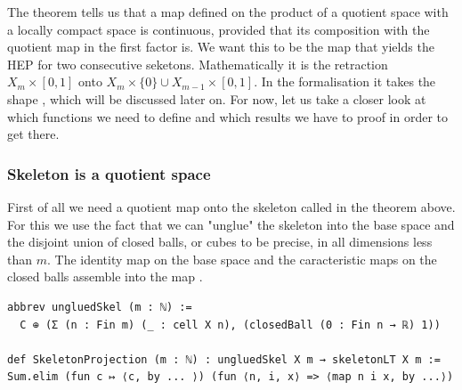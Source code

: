 \documentclass[11pt, a4paper, english]{article}
\theoremstyle{plain}
\theoremstyle{definition}
\theoremstyle{remark}
\numberwithin{equation}{section}
\numberwithin{theorem}{section}
\begin{document}
The theorem tells us that a map  defined on the product of a quotient space with a locally compact space is continuous, provided that its composition with the quotient map in the first factor is. We want this  to be the map that yields the HEP for two consecutive seketons. Mathematically it is the retraction $X_m \times [0,1]$ onto $X_m \times \{0\} \cup X_{m-1} \times [0,1]$. In the formalisation it takes the shape , which will be discussed later on. For now, let us take a closer look at which functions we need to define and which results we have to proof in order to get there. \\

\subsubsection{Skeleton is a quotient space}  \label{subsubsec:lean:skel:quotient}
First of all we need a quotient map onto the skeleton  called  in the theorem above. For this we use the fact that we can "unglue" the skeleton into the base space and the disjoint union of closed balls, or cubes to be precise, in all dimensions less than $m$. The identity map on the base space and the caracteristic maps on the closed balls assemble into the map .

\begin{verbatim}
abbrev ungluedSkel (m : ℕ) :=
  C ⊕ (Σ (n : Fin m) (_ : cell X n), (closedBall (0 : Fin n → ℝ) 1))

def SkeletonProjection (m : ℕ) : ungluedSkel X m → skeletonLT X m := Sum.elim (fun c ↦ ⟨c, by ... ⟩) (fun ⟨n, i, x⟩ => ⟨map n i x, by ...⟩)
\end{verbatim}
\end{document}
